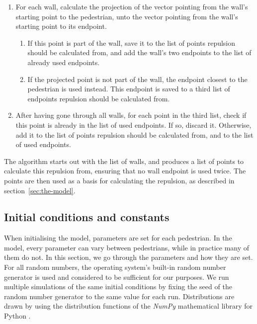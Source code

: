 \begin{enumerate}
    \item For each wall, calculate the projection of the vector pointing from 
        the wall's starting point to the pedestrian, unto the vector pointing from 
        the wall's starting point to its endpoint.
        \begin{enumerate}
            \item If this point is part of the wall, save it to the list of points 
                repulsion should be calculated from, and add the wall's two endpoints 
                to the list of already used endpoints.

            \item If the projected point is not part of the wall, the endpoint closest 
                to the pedestrian is used instead. This endpoint is saved to a 
                third list of endpoints repulsion should be calculated from.
        \end{enumerate}

    \item After having gone through all walls, for each point in the third 
        list, check if this point is already in the list of used endpoints. If 
        so, discard it. Otherwise, add it to the list of points repulsion 
        should be calculated from, and to the list of used endpoints.
\end{enumerate}

The algorithm starts out with the list of walls, and produces a list of points 
to calculate this repulsion from, ensuring that no wall endpoint is used 
twice. The points are then used as a basis for calculating the repulsion, as 
described in section~\ref{sec:the-model}.

\subsection{Initial conditions and constants}
\label{sec:init-cond}
When initialising the model, parameters are set for each pedestrian. In the 
model, every parameter can vary between pedestrians, while in practice many of them 
do not. In this section, we go through the parameters and how they are set.  
For all random numbers, the operating system's built-in random number 
generator is used and considered to be sufficient for our purposes. We run 
multiple simulations of the same initial conditions by fixing the seed of the 
random number generator to the same value for each run. Distributions are 
drawn by using the distribution functions of the \emph{NumPy} mathematical 
library for Python \cite{numpy}.

